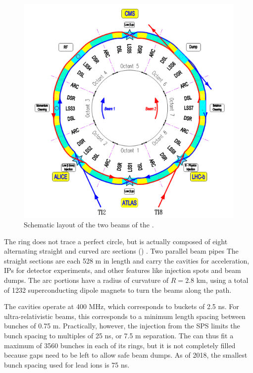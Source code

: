 \begin{figure}[t]
\includegraphics{LHC_schematic.png}
\caption{Schematic layout of the two beams of the \lhc \cite{Bruning:2004ej}.}
\label{fig:lhc_schematic}
\end{figure}

The \lhc ring does not trace a perfect circle, but is actually composed of eight alternating straight and curved arc sections () \cite{Bruning:2004ej}.
Two parallel beam pipes 
The straight sections are each 528 m in length and carry the \rf cavities for acceleration, \acp{IP} for detector experiments, and other features like injection spots and beam dumps.
The arc portions have a radius of curvature of $R = 2.8$ km, using a total of 1232 superconducting dipole magnets to turn the beams along the path.

The \rf cavities operate at 400 MHz, which corresponds to \rf buckets of 2.5 ns.
For ultra-relativistic beams, this corresponds to a minimum length spacing between bunches of 0.75 m.
Practically, however, the injection from the \ac{SPS} limits the bunch spacing to multiples of 25 ns, or 7.5 m separation.
The \lhc can thus fit a maximum of 3560 bunches in each of its rings, but it is not completely filled because gaps need to be left to allow safe beam dumps.
As of 2018, the smallest bunch spacing used for lead ions is 75 ns.

